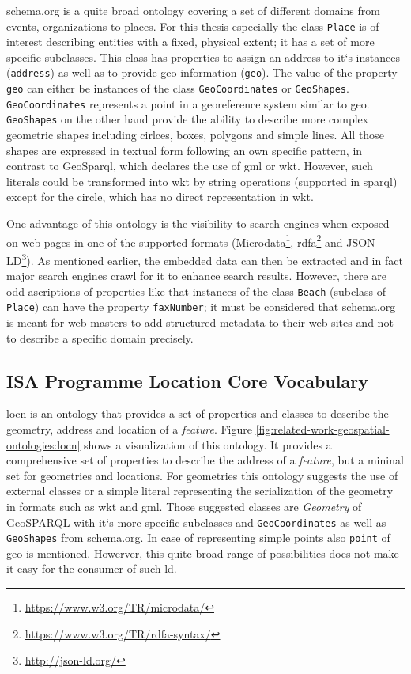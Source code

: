 \documentclass[draft,final]{vutinfth} %
\begin{document}
schema.org is a quite broad ontology covering a set of different domains from events, organizations to places. For this thesis especially the class \texttt{Place} is of interest describing entities with a fixed, physical extent; it has a set of more specific subclasses. This class has properties to assign an address to it`s instances  (\texttt{address}) as well as to provide geo-information (\texttt{geo}). The value of the property \texttt{geo} can either be instances of the class \texttt{GeoCoordinates} or \texttt{GeoShapes}. \texttt{GeoCoordinates} represents a point in a georeference system similar to \gls{geo}. \texttt{GeoShapes} on the other hand provide the ability to describe more complex geometric shapes including cirlces, boxes, polygons and simple lines. All those shapes are expressed in textual form following an own specific pattern, in contrast to GeoSparql, which declares the use of \gls{gml} or \gls{wkt}. However, such literals could be transformed into \gls{wkt} by string operations (supported in \gls{sparql}) except for the circle, which has no direct representation in \gls{wkt}.

One advantage of this ontology is the visibility to search engines when exposed on web pages in one of the supported formats (Microdata\footnote{\url{https://www.w3.org/TR/microdata/}}, \gls{rdfa}\footnote{\url{https://www.w3.org/TR/rdfa-syntax/}} and JSON-LD\footnote{\url{http://json-ld.org/}}). As mentioned earlier, the embedded data can then be extracted and in fact major search engines crawl for it to enhance search results\cite{haas_enhanced_2011}. However, there are odd ascriptions of properties like that instances of the class \texttt{Beach} (subclass of \texttt{Place}) can have the property \texttt{faxNumber}; it must be considered that schema.org is meant for web masters to add structured metadata to their web sites \cite{veres_schema.org_2013} and not to describe a specific domain precisely.

\subsection{ISA Programme Location Core Vocabulary}
\gls{locn} is an ontology that provides a set of properties and classes to describe the geometry, address and location of a \textit{feature}. Figure \ref{fig:related-work-geospatial-ontologies:locn} shows a visualization of this ontology. It provides a comprehensive set of properties to describe the address of a \textit{feature}, but a mininal set for geometries and locations. For geometries this ontology suggests the use of external classes or a simple literal representing the serialization of the geometry in formats such as \gls{wkt} and \gls{gml}. Those suggested classes are \textit{Geometry} of GeoSPARQL with it`s more specific subclasses and \texttt{GeoCoordinates} as well as \texttt{GeoShapes} from schema.org. In case of representing simple points also \texttt{point} of \gls{geo} is mentioned. \cite{perego_isa_2015} Howerver, this quite broad range of possibilities does not make it easy for the consumer of such \gls{ld}.
\end{document}
